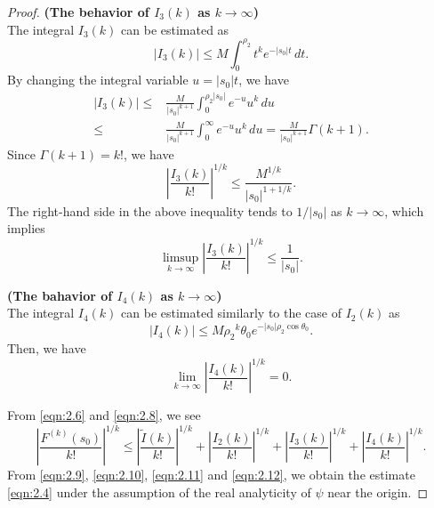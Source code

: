 \documentclass[10pt,a4paper]{amsart}
\numberwithin{equation}{section}
\newcommand{\1}{{\bf 1}}
\begin{document}
\begin{proof}
{\bf (The behavior of $I_3(k)$ as $k\to\infty$)} \\
The integral $I_3(k)$ can be estimated as
\begin{equation*}
|I_3(k)|
\le M\int_0^{\rho_2} t^k e^{-|s_0|t}\,dt.
\end{equation*}
By changing the integral variable $u=|s_0|t$,
we have
\begin{equation*}
\begin{split}
|I_3(k)|
\le &\frac{M}{|s_0|^{k+1}}
\int_0^{\rho_2 |s_0|} e^{-u} u^k \,du \\
\le &\frac{M}{|s_0|^{k+1}}
\int_0^{\infty} e^{-u} u^k \,du 
=\frac{M}{|s_0|^{k+1}}\Gamma(k+1).
\end{split}
\end{equation*}
Since $\Gamma(k+1)=k!$,
we have
\begin{equation*}
\left|\frac{I_3(k)}{k!} \right|^{1/k} 
\le \frac{M^{1/k}}{|s_0|^{1+1/k}}. 
\end{equation*}
The right-hand side in the above inequality 
tends to $1/|s_0|$ as $k \to \infty$,
which implies
\begin{equation}\label{eqn:2.11}
\limsup_{k\to \infty}
\left|\frac{I_3(k)}{k!}\right|^{1/k}\leq \frac{1}{|s_0|}.
\end{equation}

{\bf (The bahavior of $I_4(k)$ as $k\to\infty$)} \\
The integral $I_4(k)$ 
can be estimated similarly to the case of 
$I_2(k)$ as
\begin{equation*}
|I_4(k)|
\le M {\rho_2}^k \theta_0 e^{-|s_0|\rho_2 \cos\theta_0}.
\end{equation*}
Then, we have
\begin{equation}\label{eqn:2.12}
\lim_{k\to \infty}\left|\frac{I_4(k)}{k!}\right|^{1/k}
=0.
\end{equation}

From \eqref{eqn:2.6} and \eqref{eqn:2.8}, we see
\begin{equation}\label{eqn:2.13}
\left| \frac{F^{(k)}(s_0)}{k!} \right|^{1/k}
\le \left| \frac{\tilde{I}(k)}{k!} \right|^{1/k}
+\left| \frac{I_2(k)}{k!} \right|^{1/k}
+\left| \frac{I_3(k)}{k!} \right|^{1/k}
+\left| \frac{I_4(k)}{k!} \right|^{1/k}.
\end{equation}
From
\eqref{eqn:2.9}, \eqref{eqn:2.10}, 
\eqref{eqn:2.11} and \eqref{eqn:2.12},
we obtain the estimate \eqref{eqn:2.4}
under the assumption of 
the real analyticity of $\psi$ near the origin.


\end{proof}
\end{document}
